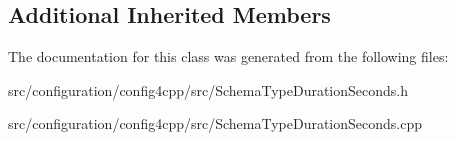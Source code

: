 \subsection*{Additional Inherited Members}


The documentation for this class was generated from the following files\-:\begin{DoxyCompactItemize}
\item 
src/configuration/config4cpp/src/Schema\-Type\-Duration\-Seconds.\-h\item 
src/configuration/config4cpp/src/Schema\-Type\-Duration\-Seconds.\-cpp\end{DoxyCompactItemize}
